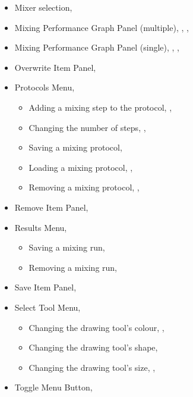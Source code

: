 \begin{itemize}
  \item Mixer selection, \pageref{sec:ChooseGeomAndMixer}
  \item Mixing Performance Graph Panel (multiple), \pageref{sec:exportMultiGraph}, \pageref{sec:mulperfgraph}, \pageref{sec:viewmultgraph}
  \item Mixing Performance Graph Panel (single), \pageref{sec:exportSingleGraph}, \pageref{sec:singperfgraph}, \pageref{sec:viewsinglegraph}
  \item Overwrite Item Panel, \pageref{sec:overwriteitem}
  \item Protocols Menu, \pageref{sec:protmenu}
  \begin{itemize}
    \item Adding a mixing step to the protocol, \pageref{sec:defineMixProt}, \pageref{sec:protmenu}
    \item Changing the number of steps, \pageref{sec:defineMixProt}, \pageref{sec:protmenu}
    \item Saving a mixing protocol, \pageref{sec:savmixprot}
    \item Loading a mixing protocol, \pageref{sec:defineMixProt}, \pageref{sec:loadMixProt}
    \item Removing a mixing protocol, \pageref{sec:defineMixProt}, \pageref{sec:remmixprot}
  \end{itemize}

  \item Remove Item Panel, \pageref{sec:removeitem}
  \item Results Menu, \pageref{sec:resultsmenu}
  \begin{itemize}
    \item Saving a mixing run, \pageref{sec:savmixrun}
    \item Removing a mixing run, \pageref{sec:remmixrun}
  \end{itemize}
  
  \item Save Item Panel, \pageref{sec:saveitem}
  \item Select Tool Menu, \pageref{sec:selecttoolmenu}
  \begin{itemize}
    \item Changing the drawing tool's colour, \pageref{sec:defineDist}, \pageref{sec:selecttoolmenu}
    \item Changing the drawing tool's shape, \pageref{sec:selecttoolmenu}
    \item Changing the drawing tool's size, \pageref{sec:defineDist}, \pageref{sec:selecttoolmenu}
  \end{itemize}
  \item Toggle Menu Button, \pageref{sec:togmenu}
\end{itemize}
